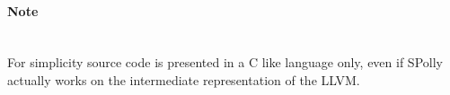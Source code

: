 \vspace*{5mm}
\paragraph*{Note} ~ \\
For simplicity source code is presented in a C like language only, even if 
SPolly actually works on the intermediate representation of the LLVM. \\



